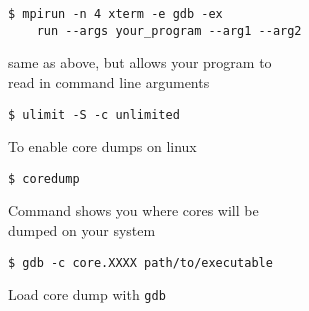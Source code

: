 \documentclass[10pt, a4paper, english, parskip, twocolumn]{scrartcl}
\newcommand{\code}[1]{\texttt{#1}}
\newcommand{\gdbsection}[1]{\begin{mdframed}[frametitlebackgroundcolor=bittersweet,style=section,
frametitle=#1]\end{mdframed}}
\begin{document}
\begin{lstlisting}[belowskip=-0.8 \baselineskip]
$ mpirun -n 4 xterm -e gdb -ex
    run --args your_program --arg1 --arg2
\end{lstlisting}
\quad\quad same as above, but allows your program to \\
\quad\quad read in command line arguments







\gdbsection{gdb and core dumps}

\begin{lstlisting}[belowskip=-0.8 \baselineskip]
$ ulimit -S -c unlimited
\end{lstlisting}
\quad\quad To enable core dumps on linux

\begin{lstlisting}[belowskip=-0.8 \baselineskip]
$ coredump
\end{lstlisting}
\quad\quad Command shows you where cores will be \\
\quad\quad dumped on your system

\begin{lstlisting}[belowskip=-0.8 \baselineskip]
$ gdb -c core.XXXX path/to/executable
\end{lstlisting}
\quad\quad Load core dump with \code{gdb}









\gdbsection{gdb breakpoints}
\end{document}
